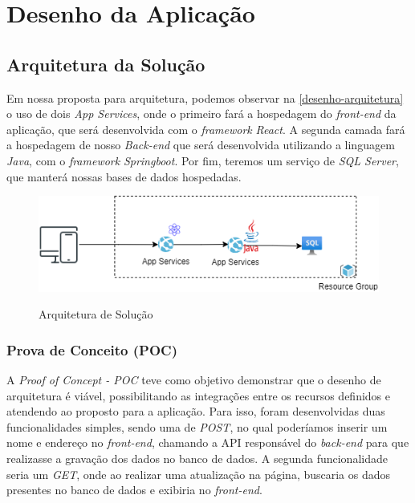 \chapter[Desenho da Aplicação]{Desenho da Aplicação}

\section{Arquitetura da Solução}

Em nossa proposta para arquitetura, podemos observar na \autoref{desenho-arquitetura} o uso de dois \textit{App Services}, onde o primeiro fará a hospedagem do \textit{front-end} da aplicação, que será desenvolvida com o \textit{framework} \textit{React}. A segunda camada fará a hospedagem de nosso \textit{Back-end} que será desenvolvida utilizando a linguagem \textit{Java}, com o \textit{framework} \textit{Springboot}.
Por fim, teremos um serviço de \textit{SQL Server}, que manterá nossas bases de dados hospedadas.

\begin{figure}[h]
\caption{Arquitetura de Solução}
\centering %
\label{desenho-arquitetura}
\includegraphics[width=15cm]{anexos/arquitetura_v1.png} %
\end{figure}
\subsection{Prova de Conceito (POC)}
A \textit{Proof of Concept - POC} teve como objetivo demonstrar que o desenho de arquitetura é viável, possibilitando as integrações entre os recursos definidos e atendendo ao proposto para a aplicação.
Para isso, foram desenvolvidas duas funcionalidades simples, sendo uma de \textit{POST}, no qual poderíamos inserir um nome e endereço no \textit{front-end}, chamando a API responsável do \textit{back-end} para que realizasse a gravação dos dados no banco de dados. A segunda funcionalidade seria um \textit{GET}, onde ao realizar uma atualização na página, buscaria os dados presentes no banco de dados e exibiria no \textit{front-end}.

